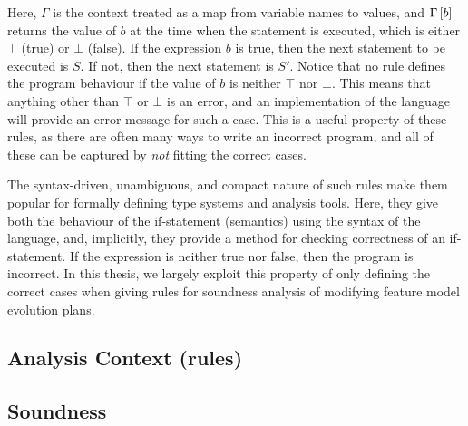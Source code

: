 Here, $\Gamma$ is the context treated as a map from variable names to values, and $\Gamma \left[ b \right]$ returns the value of $b$ at the time when the statement is executed, which is either $\top$ (true) or $\bot$ (false). If the expression $b$ is true, then the next statement to be executed is $S$. If not, then the next statement is $S'$. Notice that no rule defines the program behaviour if the value of $b$ is neither $\top$ nor $\bot$. This means that anything other than $\top$ or $\bot$ is an error, and an implementation of the language will provide an error message for such a case. This is a useful property of these rules, as there are often many ways to write an incorrect program, and all of these can be captured by \emph{not} fitting the correct cases.

The syntax-driven, unambiguous, and compact nature of such rules make them popular for formally defining type systems and analysis tools. Here, they give both the behaviour of the if-statement (semantics) using the syntax of the language, and, implicitly, they provide a method for checking correctness of an if-statement. If the expression is neither true nor false, then the program is incorrect. In this thesis, we largely exploit this property of only defining the correct cases when giving rules for soundness analysis of modifying feature model evolution plans.



\subsection{Analysis Context (rules)}
\label{sub:analysis-context}
\subsection{Soundness}
